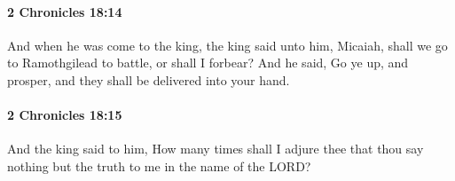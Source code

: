 		\paragraph{2 Chronicles 18:14} %
			\label{2CHRONICLES-18-14}

			And when he was come to the king, the king said unto him, Micaiah, shall we go to Ramothgilead to battle, or shall I forbear? And he said, Go ye up, and prosper, and they shall be delivered into your hand.


		\paragraph{2 Chronicles 18:15} %
			\label{2CHRONICLES-18-15}

			And the king said to him, How many times shall I adjure thee that thou say nothing but the truth to me in the name of the LORD?


